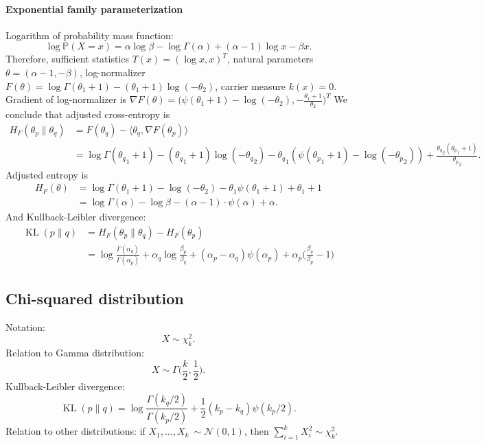 \documentclass[a4paper,11pt]{article}
\theoremstyle{plain}
\theoremstyle{definition}
\newcommand{\MP}{\mathbb{P}}
\begin{document}
	\paragraph{Exponential family parameterization}
	Logarithm of probability mass function:
	\[
	\log \MP(X = x) = \alpha \log \beta - \log \Gamma(\alpha) + (\alpha - 1) \log x - \beta x.
	\]
	Therefore, sufficient statistics $T(x) = (\log x, x)^T$, natural parameters $\theta = (\alpha-1, -\beta)$, log-normalizer $F(\theta) = \log \Gamma (\theta_1 + 1) - (\theta_1 + 1) \log (-\theta_2)$, carrier measure $k(x) = 0$. Gradient of log-normalizer is $\nabla F(\theta) = \big(\psi(\theta_1 + 1) - \log(-\theta_2), -\frac{\theta_1+1}{\theta_2} \big)^T$ We conclude that adjusted cross-entropy is
	\[
	\begin{aligned}
	H_F(\theta_p \| \theta_q) &= F(\theta_q) - \langle \theta_q, \nabla F(\theta_p) \rangle \\
	&= \log \Gamma ({\theta_q}_1 + 1) - ({\theta_q}_1 + 1) \log (-{\theta_q}_2) - {\theta_q}_1 (\psi({\theta_p}_1 + 1) - \log(-{\theta_p}_2)) + \frac{{\theta_q}_2 ({\theta_p}_1 + 1)}{{\theta_p}_2}.
	\end{aligned}
	\]
	Adjusted entropy is
	\[
	\begin{aligned}
	H_F(\theta) &= \log \Gamma ({\theta}_1 + 1) - \log (-{\theta}_2) - {\theta}_1 \psi({\theta}_1 + 1) + {\theta}_1 + 1 \\
	& = \log \Gamma (\alpha) - \log \beta - (\alpha - 1) \cdot \psi (\alpha) + \alpha.
	\end{aligned}
	\]
	And Kullback-Leibler divergence:
	\[
	\begin{aligned}
	\operatorname{KL}(p \| q) &= H_F(\theta_p \| \theta_q) - H_F(\theta_p) \\
	&= \log \frac{\Gamma (\alpha_q)}{\Gamma (\alpha_p)} + \alpha_q \log \frac{\beta_p}{\beta_q} + (\alpha_p - \alpha_q) \psi(\alpha_p) + \alpha_p \bigg(\frac{\beta_q}{\beta_p} - 1\bigg)
	\end{aligned}
	\]
	
	\subsection{Chi-squared distribution}
	Notation:
	\[
	X \sim \chi_k^2.
	\]
	Relation to Gamma distribution:
	\[
	X \sim \Gamma\bigg( \frac{k}{2}, \frac{1}{2} \bigg).
	\]
	Kullback-Leibler divergence:
	\[
	\operatorname{KL}(p \| q) = \log \frac{\Gamma(k_q/2)}{\Gamma(k_p/2)} + \frac{1}{2}(k_p - k_q) \psi(k_p / 2).
	\]
	Relation to other distributions: if $X_1, \dots, X_k ~ \sim \mathcal{N}(0, 1)$, then $\sum_{i=1}^{k}X_i^2 \sim \chi_k^2$.
	
\end{document}
